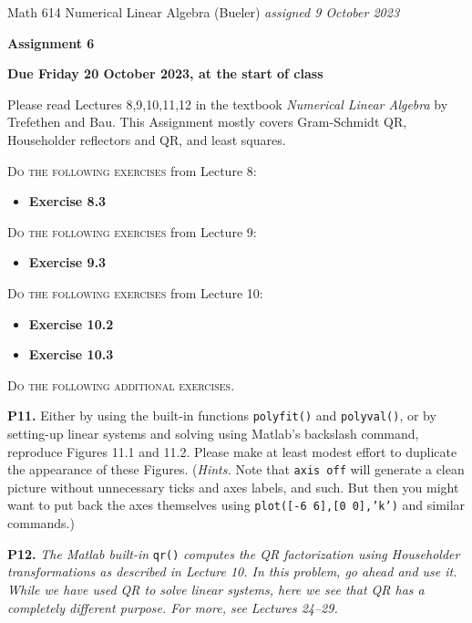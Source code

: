 \documentclass[12pt]{amsart}
\newcommand{\prob}[1]{\bigskip\noindent\textbf{#1.}\quad }
\begin{document}
\scriptsize \noindent Math 614 Numerical Linear Algebra (Bueler) \hfill \emph{assigned 9 October 2023}
\normalsize\medskip

\Large\centerline{\textbf{Assignment 6}}
\large
\medskip

\centerline{\textbf{Due Friday 20 October 2023, at the start of class}}
\medskip
\normalsize

\thispagestyle{empty}

\bigskip
\noindent Please read Lectures 8,9,10,11,12 in the textbook \emph{Numerical Linear Algebra} by Trefethen and Bau.  This Assignment mostly covers Gram-Schmidt QR, Householder reflectors and QR, and least squares.

\bigskip
\noindent \textsc{Do the following exercises} from Lecture 8:

\begin{itemize}
\item \textbf{Exercise 8.3}
\end{itemize}

\bigskip
\noindent \textsc{Do the following exercises} from Lecture 9:

\begin{itemize}
\item \textbf{Exercise 9.3}
\end{itemize}

\bigskip
\noindent \textsc{Do the following exercises} from Lecture 10:

\begin{itemize}
\item \textbf{Exercise 10.2}
\item \textbf{Exercise 10.3}
\end{itemize}


\bigskip
\noindent \textsc{Do the following additional exercises.}

\prob{P11}  Either by using the built-in functions \texttt{polyfit()} and \texttt{polyval()}, or by setting-up linear systems and solving using Matlab's backslash command, reproduce Figures 11.1 and 11.2.  Please make at least modest effort to duplicate the appearance of these Figures.  (\emph{Hints.}  Note that \texttt{axis off} will generate a clean picture without unnecessary ticks and axes labels, and such.  But then you might want to put back the axes themselves using \texttt{plot([-6 6],[0 0],'k')} and similar commands.)


\prob{P12}  \emph{The Matlab built-in} \texttt{qr()} \emph{computes the QR factorization using Householder transformations as described in Lecture 10.  In this problem, go ahead and use it.  While we have used QR to solve linear systems, here we see that QR has a completely different purpose.  For more, see Lectures 24--29.}
\end{document}

